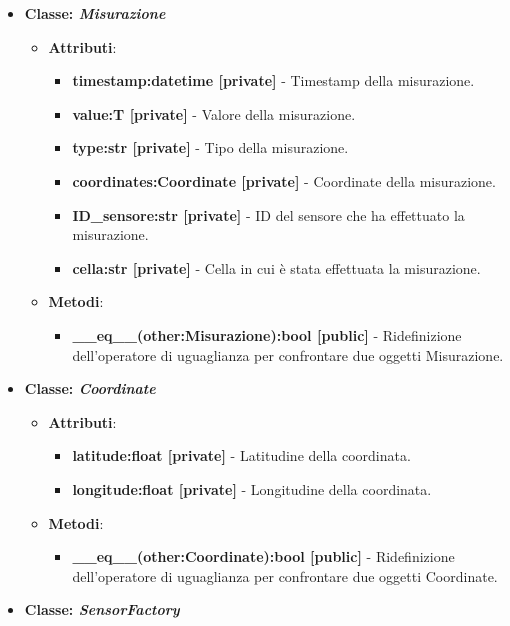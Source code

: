\begin{itemize}
    \item{\textbf{Classe: \textit{Misurazione}}}
    \begin{itemize}
        \item   \textbf{Attributi}: 
    \begin{itemize}
        \item \textbf{timestamp:datetime [private]} - Timestamp della misurazione.
        \item \textbf{value:T [private]} - Valore della misurazione.
        \item \textbf{type:str [private]} - Tipo della misurazione.
        \item \textbf{coordinates:Coordinate [private]} - Coordinate della misurazione.
        \item \textbf{ID\_sensore:str [private]} - ID del sensore che ha effettuato la misurazione.
        \item \textbf{cella:str [private]} - Cella in cui è stata effettuata la misurazione.
    \end{itemize}
    \item   \textbf{Metodi}: 
    \begin{itemize}
        \item \textbf{\_\_eq\_\_(other:Misurazione):bool [public]} - Ridefinizione dell'operatore di uguaglianza per confrontare due oggetti Misurazione.
    \end{itemize}
\end{itemize}
    \item{\textbf{Classe: \textit{Coordinate}}}
    \begin{itemize}
        \item    \textbf{Attributi}: 
    \begin{itemize}
        \item \textbf{latitude:float [private]} - Latitudine della coordinata.
        \item \textbf{longitude:float [private]} - Longitudine della coordinata.
    \end{itemize}
    \item     \textbf{Metodi}: 
    \begin{itemize}
        \item \textbf{\_\_eq\_\_(other:Coordinate):bool [public]} - Ridefinizione dell'operatore di uguaglianza per confrontare due oggetti Coordinate.
    \end{itemize}
\end{itemize}
    \item{\textbf{Classe: \textit{SensorFactory}}}

\end{itemize}
